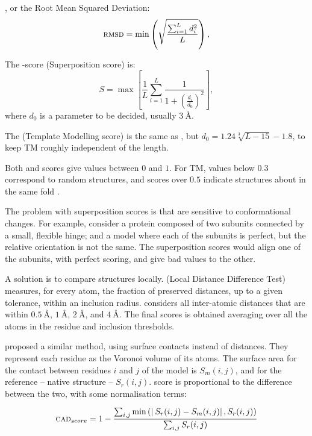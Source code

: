 \RMSD, or the Root Mean Squared Deviation:
\begin{equation*}
\textsc{rmsd} = \min \left(\sqrt{\frac{\sum_{i=1}^L d_i^2}{L}}\right),
\end{equation*}

The \Ss-score (Superposition score) is:
\begin{equation*}
S = \max\left[\frac{1}{L} \sum_{i=1}^L \frac{1}{1 + \left(\frac{d_i}{d_0}\right)^2}\right],
\end{equation*}
where $d_0$ is a parameter to be decided, usually $\SI{3}{\angstrom}$.

The \TM{} (Template Modelling score) is the same as \Ss, but $d_0 = 1.24 \sqrt[3]{L - 15} - 1.8$, to keep TM roughly independent of the length.

Both \Ss{} and \TM{} scores give values between $0$ and $1$.
For TM, values below $0.3$ correspond to random structures, and scores over $0.5$ indicate structures about in the same fold \citep{tmscore05}.

The problem with superposition scores is that are sensitive to conformational changes.
For example, consider a protein composed of two subunits connected by a small, flexible hinge; and a model where each of the subunits is perfect, but the relative orientation is not the same.
The superposition scores would align one of the subunits, with perfect scoring, and give bad values to the other.

A solution is to compare structures locally. 
\LDDT{} (Local Distance Difference Test) \citep{lddt} \marginpar{\LDDT}
measures, for every atom, the fraction of preserved  distances, up to a given tolerance, within an inclusion radius.
\LDDT{} considers all inter-atomic distances that are within $\SI{0.5}{\angstrom}$, $\SI{1}{\angstrom}$, $\SI{2}{\angstrom}$, and $\SI{4}{\angstrom}$.
The final scores is obtained averaging over all the atoms in the residue and inclusion thresholds.

\citet{cad} proposed a similar method, using surface contacts instead of distances. \marginpar{\CAD}
They represent each residue as the Voronoi volume of its atoms.
The surface area for the contact between residues $i$ and $j$ of the model is $S_m(i,j)$, and for the reference -- native structure -- $S_r(i,j)$.
\CAD{} score is proportional to the difference between the two, with some normalisation terms:

\begin{equation*}
\textsc{cad}_{score} = 1 - \frac{\sum_{i,j} \min\left( \left| \: S_{r}(i, j) - S_{m}(i, j)\right|, S_{r}(i, j)\right)}{\sum_{i,j} S_{r}(i, j)}
\end{equation*}


